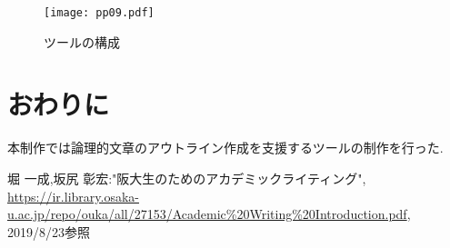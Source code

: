 \documentclass[twocolumn,10pt,a4j]{jsarticle}
\begin{document}
\begin{figure}[h]
\begin{center}
 \texttt{[image: pp09.pdf]}
\end{center}
 \caption{ツールの構成}
 \label{fig:教科書}
\end{figure}

\section{おわりに}
本制作では論理的文章のアウトライン作成を支援するツールの制作を行った.

\begin{thebibliography}{99}
 堀 一成,坂尻 彰宏:"阪大生のためのアカデミックライティング",
\url{https://ir.library.osaka-u.ac.jp/repo/ouka/all/27153/Academic%20Writing%20Introduction.pdf}, 2019/8/23参照


\end{thebibliography}
\end{document}
